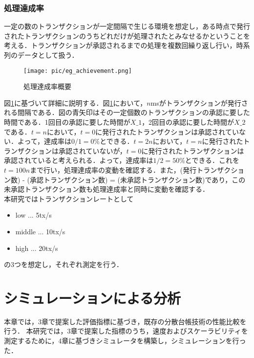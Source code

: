 \documentclass[japanese, macos]{KU2}
\begin{document}
\subsection{処理達成率}
一定の数のトランザクションが一定間隔で生じる環境を想定し，ある時点で発行されたトランザクションのうちどれだけが処理されたとみなせるかということを考える．トランザクションが承認されるまでの処理を複数回繰り返し行い，時系列のデータとして扱う．
\begin{figure}[htbp]
  \begin{center} 
    \texttt{[image: pic/eg\_achievement.png]}
    \caption{処理達成率概要}
    \label{fig:eg_achievement} 
  \end{center}
\end{figure}

図\ref{fig:eg_achievement}に基づいて詳細に説明する．図\ref{fig:eg_achievement}において，$n$msがトランザクションが発行される間隔である．図の青矢印はその一定個数のトランザクションの承認に要した時間である．1回目の承認に要した時間が$X\_1$，2回目の承認に要した時間が$X\_2$である．$t = n$において，$t = 0$に発行されたトランザクションは承認されていない．よって，達成率は$0/1 = 0\%$とできる．$t = 2n$において，$t = n$に発行されたトランザクションは承認されていないが，$t = 0$に発行されたトランザクションは承認されていると考えられる．よって，達成率は$1/2 = 50\%$とできる．これを$t =100 n$まで行い，処理達成率の変動を確認する．また，(発行トランザクション数) - (承認トランザクション数) = (未承認トランザクション数)であり，この未承認トランザクション数も処理達成率と同時に変動を確認する．\\
本研究ではトランザクションレートとして
\begin{itemize}
\item low ... 5tx/s
\item middle ... 10tx/s
\item high ... 20tx/s
\end{itemize}
の3つを想定し，それぞれ測定を行う．

\chapter{シミュレーションによる分析}
本章では，3章で提案した評価指標に基づき，既存の分散台帳技術の性能比較を行う．
本研究では，3章で提案した指標のうち，速度およびスケーラビリティを測定するために，4章に基づきシミュレータを構築し，シミュレーションを行った．
\end{document}

